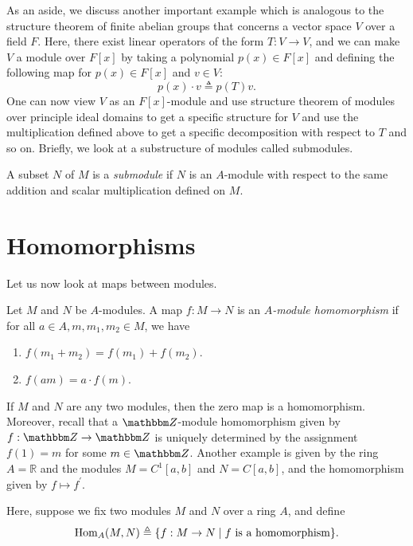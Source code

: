 As an aside, we discuss another important example which is analogous to the structure theorem of finite abelian groups that concerns a vector space $V$ over a field $F$. Here, there exist linear operators of the form $T: V \rightarrow V$, and we can make $V$ a module over $F[x]$ by taking a polynomial $p(x) \in F[x]$ and defining the following map for $p(x) \in F[x]$ and $v \in V$: 
\[p(x) \cdot v\triangleq p(T)v.\]
One can now view $V$ as an $F[x]$-module and use structure theorem of modules over principle ideal domains to get a specific structure for $V$ and use the multiplication defined above to get a specific decomposition with respect to $T$ and so on. Briefly, we look at a substructure of modules called submodules.
\begin{definition}[Submodule]
    A subset $N$ of $M$ is a {\it submodule} if $N$ is an $A$-module with respect to the same addition and scalar multiplication defined on $M$.
\end{definition}

\section{Homomorphisms}
Let us now look at maps between modules.
\begin{definition}[Homomorphism]
    Let $M$ and $N$ be $A$-modules. A map $f: M \rightarrow N$ is an {\it$A$-module homomorphism }if for all $a \in A, m, m_{1}, m_{2} \in M$, we have
    \begin{enumerate}
        \item $f\left(m_{1}+m_{2}\right)=f\left(m_{1}\right)+f\left(m_{2}\right)$.
        \item $f(a m)=a \cdot f(m)$.
    \end{enumerate}
\end{definition}
\begin{example}
    If $M$ and $N$ are any two modules, then the zero map is a homomorphism.  Moreover, recall that a 
    $\Z$-module homomorphism given by $f: \Z \rightarrow \Z$ is uniquely determined by the assignment $f(1) = m$ for some $m \in \Z$. Another example is given by the ring $A=\mathbb{R}$ and the modules $M=C^{1}[a, b]$ and $N=C[a, b]$, and the homomorphism given by $f \mapsto f^{\prime}$.
\end{example}

Here, suppose we fix two modules $M$ and $N$ over a ring $A$, and define 
\[
{\operatorname{\text{Hom\/}}}_{A}(M, N) \triangleq\{f: M \rightarrow N \mid f\text{ is a homomorphism}\}.
\] 

